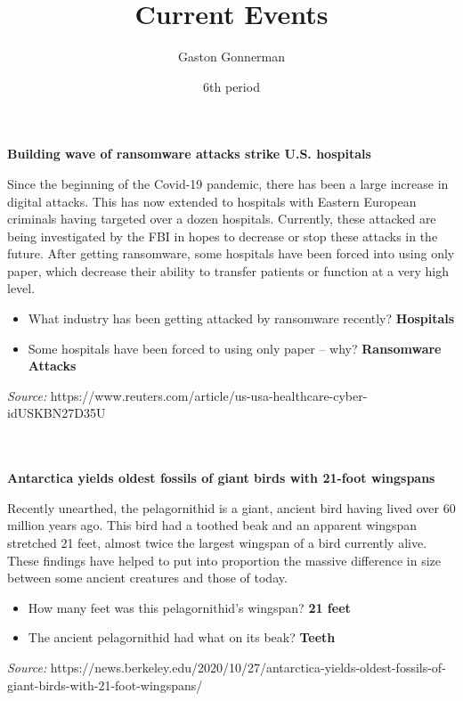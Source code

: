 \documentclass{article}
\title{Current Events}
\author{Gaston Gonnerman}
\date{6th period}
\begin{document}
	\maketitle
	
	\begin{center}
		\large{
			\textbf{Building wave of ransomware attacks strike U.S. hospitals}
		}
	\end{center}
	\par Since the beginning of the Covid-19 pandemic, there has been a large increase in digital attacks. This has now extended to hospitals with Eastern European criminals having targeted over a dozen hospitals. Currently, these attacked are being investigated by the FBI in hopes to decrease or stop these attacks in the future. After getting ransomware, some hospitals have been forced into using only paper, which decrease their ability to transfer patients or function at a very high level.
	
	\begin{itemize}[label=--]
		\item What industry has been getting attacked by ransomware recently? \textbf{Hospitals}
		\item Some hospitals have been forced to using only paper -- why? \textbf{Ransomware Attacks}
	\end{itemize}

	\noindent
	\emph{Source:} https://www.reuters.com/article/us-usa-healthcare-cyber-idUSKBN27D35U
	\\ \\ \\
	
	\begin{center}
		\large{
			\textbf{Antarctica yields oldest fossils of giant birds with 21-foot wingspans}
		}
	\end{center}
	\par Recently unearthed, the pelagornithid is a  giant, ancient bird having lived over 60 million years ago. This bird had a toothed beak and an apparent wingspan stretched 21 feet, almost twice the largest wingspan of a bird currently alive. These findings have helped to put into proportion the massive difference in size between some ancient creatures and those of today.
	
	\begin{itemize}[label=--]
		\item How many feet was this pelagornithid's wingspan? \textbf{21 feet}
		\item The ancient pelagornithid had what on its beak? \textbf{Teeth}
	\end{itemize}

	\noindent
	\emph{Source:} https://news.berkeley.edu/2020/10/27/antarctica-yields-oldest-fossils-of-giant-birds-with-21-foot-wingspans/
\end{document}

